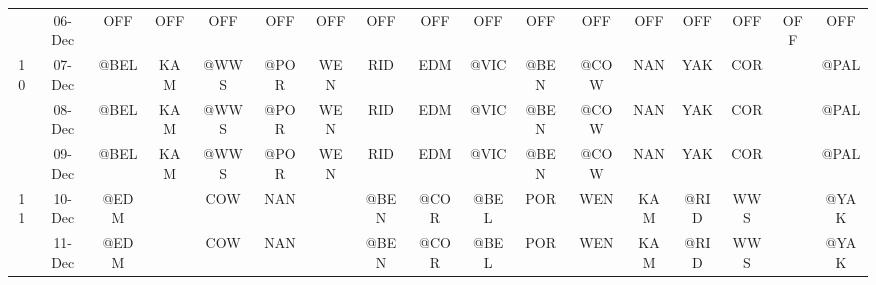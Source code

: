 \begin{table}[htbp]
\begin{tabular}{ccrrrrrrrrrrrrrrr}
          & 06-Dec & \multicolumn{1}{c}{OFF} & \multicolumn{1}{c}{OFF} & \multicolumn{1}{c}{OFF} & \multicolumn{1}{c}{OFF} & \multicolumn{1}{c}{OFF} & \multicolumn{1}{c}{OFF} & \multicolumn{1}{c}{OFF} & \multicolumn{1}{c}{OFF} & \multicolumn{1}{c}{OFF} & \multicolumn{1}{c}{OFF} & \multicolumn{1}{c}{OFF} & \multicolumn{1}{c}{OFF} & \multicolumn{1}{c}{OFF} & \multicolumn{1}{c}{OFF} & \multicolumn{1}{c}{OFF} \\
    10    & 07-Dec & \multicolumn{1}{c}{@BEL} & \multicolumn{1}{c}{KAM} & \multicolumn{1}{c}{@WWS} & \multicolumn{1}{c}{@POR} & \multicolumn{1}{c}{WEN} & \multicolumn{1}{c}{RID} & \multicolumn{1}{c}{EDM} & \multicolumn{1}{c}{\cellcolor[rgb]{ .588,  .588,  .588}@VIC} & \multicolumn{1}{c}{@BEN} & \multicolumn{1}{c}{@COW} & \multicolumn{1}{c}{NAN} & \multicolumn{1}{c}{YAK} & \multicolumn{1}{c}{COR} &       & \multicolumn{1}{c}{@PAL} \\
          & 08-Dec & \multicolumn{1}{c}{@BEL} & \multicolumn{1}{c}{KAM} & \multicolumn{1}{c}{@WWS} & \multicolumn{1}{c}{@POR} & \multicolumn{1}{c}{WEN} & \multicolumn{1}{c}{RID} & \multicolumn{1}{c}{EDM} & \multicolumn{1}{c}{\cellcolor[rgb]{ .588,  .588,  .588}@VIC} & \multicolumn{1}{c}{@BEN} & \multicolumn{1}{c}{@COW} & \multicolumn{1}{c}{NAN} & \multicolumn{1}{c}{YAK} & \multicolumn{1}{c}{COR} &       & \multicolumn{1}{c}{@PAL} \\
          & 09-Dec & \multicolumn{1}{c}{@BEL} & \multicolumn{1}{c}{KAM} & \multicolumn{1}{c}{@WWS} & \multicolumn{1}{c}{@POR} & \multicolumn{1}{c}{WEN} & \multicolumn{1}{c}{RID} & \multicolumn{1}{c}{EDM} & \multicolumn{1}{c}{\cellcolor[rgb]{ .588,  .588,  .588}@VIC} & \multicolumn{1}{c}{@BEN} & \multicolumn{1}{c}{@COW} & \multicolumn{1}{c}{NAN} & \multicolumn{1}{c}{YAK} & \multicolumn{1}{c}{COR} &       & \multicolumn{1}{c}{@PAL} \\
    11    & 10-Dec & \multicolumn{1}{c}{@EDM} &       & \multicolumn{1}{c}{COW} & \multicolumn{1}{c}{NAN} &       & \multicolumn{1}{c}{@BEN} & \multicolumn{1}{c}{@COR} & \multicolumn{1}{c}{\cellcolor[rgb]{ .588,  .588,  .588}@BEL} & \multicolumn{1}{c}{POR} & \multicolumn{1}{c}{WEN} & \multicolumn{1}{c}{KAM} & \multicolumn{1}{c}{@RID} & \multicolumn{1}{c}{WWS} &       & \multicolumn{1}{c}{@YAK} \\
          & 11-Dec & \multicolumn{1}{c}{@EDM} &       & \multicolumn{1}{c}{COW} & \multicolumn{1}{c}{NAN} &       & \multicolumn{1}{c}{@BEN} & \multicolumn{1}{c}{@COR} & \multicolumn{1}{c}{\cellcolor[rgb]{ .588,  .588,  .588}@BEL} & \multicolumn{1}{c}{POR} & \multicolumn{1}{c}{WEN} & \multicolumn{1}{c}{KAM} & \multicolumn{1}{c}{@RID} & \multicolumn{1}{c}{WWS} &       & \multicolumn{1}{c}{@YAK} \\

\end{tabular}
\end{table}
